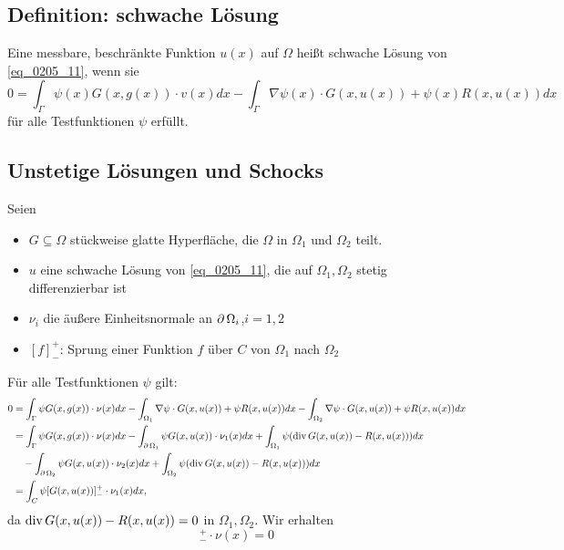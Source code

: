 \subsection{Definition: schwache Lösung}
\label{def_schwache_lsg} \label{def_16}
	Eine messbare, beschränkte Funktion $u(x)$ auf $\Omega$ heißt schwache Lösung von \eqref{eq_0205_11}, wenn sie \marginnote{[16]}
	\begin{equation}
		0 = \int_\Gamma \psi(x) G(x,g(x)) \cdot v(x) dx - \int_\Gamma \nabla \psi(x) \cdot G(x,u(x)) + \psi (x) R(x,u(x)) dx \label{eq_0205_12}
	\end{equation}
	für alle Testfunktionen $\psi$ erfüllt.

\subsection{Unstetige Lösungen und Schocks}
	Seien
	\begin{itemize}
		\item $G \subseteq \Omega$ stückweise glatte Hyperfläche, die $\Omega$ in $\Omega_1$ und $\Omega_2$ teilt.
		\item $u$ eine schwache Lösung von \eqref{eq_0205_11}, die auf $\Omega_1,\Omega_2$ stetig differenzierbar ist
		\item $\nu_i$ die äußere Einheitsnormale an $\operatorname{\partial} \Omega_i$,$i=1,2$
		\item $[f]_-^+$: Sprung einer Funktion $f$ über $C$ von $\Omega_1$ nach $\Omega_2$
	\end{itemize}
	Für alle Testfunktionen $\psi$ gilt:
	\begin{equation}
	\begin{aligned}
		0 &= \int_\Gamma \psi G(x,g(x)) \cdot \nu(x)dx - \int_{\Omega_1} \nabla \psi \cdot G(x,u(x)) + \psi R(x,u(x)) dx - \int_{\Omega_2} \nabla \psi \cdot G(x,u(x)) + \psi R(x,u(x)) dx \\ \notag
		&= \int_{\Gamma} \psi G(x,g(x)) \cdot \nu(x) dx - \int_{\operatorname{\partial}\Omega_1} \psi G(x,u(x)) \cdot \nu_1(x) dx + \int_{\Omega_1} \psi (\operatorname{div} G(x,u(x)) - R(x,u(x))) dx \\
		&\quad - \int_{\operatorname{\partial}\Omega_2} \psi G(x,u(x)) \cdot \nu_2(x) dx + \int_{\Omega_2} \psi (\operatorname{div} G(x,u(x)) - R(x,u(x))) dx \\
		&= \int_C \psi[G(x,u(x))]_-^+ \cdot \nu_1(x) dx,
	\end{aligned}
	\end{equation}
	da $\operatorname{div} G(x,u(x)) - R(x,u(x)) = 0$ in $\Omega_1,\Omega_2$. Wir erhalten
	\begin{equation}
		[G(x,u(x))]_-^+ \cdot \nu(x) = 0 \label{eq_0205_13}
	\end{equation}
